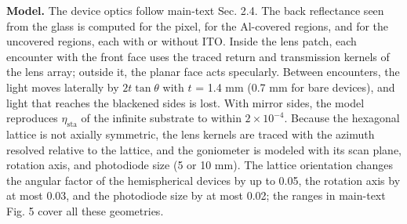 \documentclass[10pt]{article}
\begin{document}
\begin{table}[htbp]
\centering
\footnotesize
\caption*{\textbf{Table S16.} Green devices. Tilt: shift fitted to the asymmetry between positive and negative angles. Angular factor per scan (freeform without 70–80\ensuremath{^\circ}). EQE$_{0\ensuremath{^\circ}}$: Lambertian-equivalent on-axis EQE. EQE: EQE$_{0\ensuremath{^\circ}}$ times the mean angular factor.}
\end{table}

\textbf{Model.} The device optics follow main-text Sec. 2.4. The back reflectance seen from the glass is computed for the pixel, for the Al-covered regions, and for the uncovered regions, each with or without ITO. Inside the lens patch, each encounter with the front face uses the traced return and transmission kernels of the lens array; outside it, the planar face acts specularly. Between encounters, the light moves laterally by $2t\tan\theta$ with $t$ = 1.4 mm (0.7 mm for bare devices), and light that reaches the blackened sides is lost. With mirror sides, the model reproduces $\eta_{\mathrm{sta}}$ of the infinite substrate to within $2\times10^{-4}$. Because the hexagonal lattice is not axially symmetric, the lens kernels are traced with the azimuth resolved relative to the lattice, and the goniometer is modeled with its scan plane, rotation axis, and photodiode size (5 or 10 mm). The lattice orientation changes the angular factor of the hemispherical devices by up to 0.05, the rotation axis by at most 0.03, and the photodiode size by at most 0.02; the ranges in main-text Fig. 5 cover all these geometries.
\end{document}
